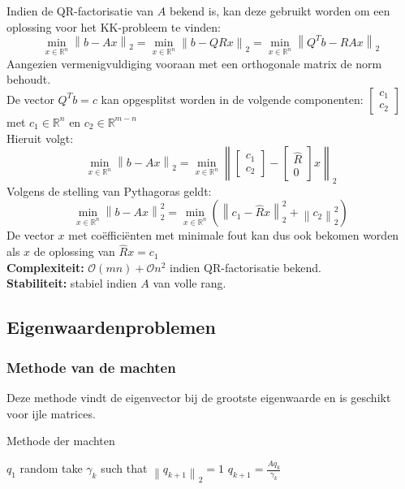 \documentclass{article}
\newcommand{\norm}[1]{\left\lVert#1\right\rVert}
\begin{document}
	Indien de QR-factorisatie van $A$ bekend is, kan deze gebruikt worden om een oplossing voor het KK-probleem te vinden:
	$$
	\min_{x \in \mathbb{R}^n} \norm{b-Ax}_2  
	= \min_{x \in \mathbb{R}^n} \norm{b-QRx}_2
	= \min_{x \in \mathbb{R}^n} \norm{Q^Tb-RAx}_2 
	$$
	Aangezien vermenigvuldiging vooraan met een orthogonale matrix de norm behoudt. \\	
	De  vector $Q^Tb=c$ kan opgesplitst worden in  de volgende componenten:
	$
	\begin{bmatrix}
		c_1\\
		c_2
	\end{bmatrix}
	$
	met $c_1 \in \mathbb{R}^n$ en $c_2 \in \mathbb{R}^{m-n}$\\
	Hieruit volgt:
	$$
	\min_{x \in \mathbb{R}^n} \norm{b-Ax}_2 
	= 	\min_{x \in \mathbb{R}^n} \norm{
		\begin{bmatrix}
		c_1\\
		c_2
		\end{bmatrix}
		-
		\begin{bmatrix}
			\hat{R}\\
			0
		\end{bmatrix}
		x}_2 
	$$
	Volgens de stelling van Pythagoras geldt:
	$$
	\min_{x \in \mathbb{R}^n} \norm{b-Ax}_2^2
	= \min_{x \in \mathbb{R}^n} (\norm{c_1-\hat{R}x}_2^2 + \norm{c_2}_2^2)
	$$
	De vector $x$ met coëfficiënten met minimale fout kan dus ook bekomen worden als $x$ de oplossing van $\hat{R}x = c_1$\\
	
	\textbf{Complexiteit:} $\mathcal{O}(mn) + \mathcal{O}n^2$ indien QR-factorisatie bekend.\\
	\textbf{Stabiliteit:} stabiel indien $A$ van volle rang.
	

	\subsection{Eigenwaardenproblemen}
	
	\subsubsection{Methode van de machten}
	Deze methode vindt de eigenvector bij de grootste eigenwaarde en is geschikt voor ijle matrices.
	
	\begin{algorithm}[!ht]
		\caption{Methode der machten}
		\begin{algorithmic}[1]
				\State $q_1$ random
					\State take $\gamma_k$ such that $\norm{q_{k+1}}_2 = 1$
					\State $q_{k+1} = \frac{Aq_k}{\gamma_k} $
				\EndFor
			\EndProcedure
		\end{algorithmic}
	\end{algorithm}
\end{document}
